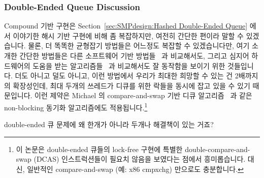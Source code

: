 \subsubsection{Double-Ended Queue Discussion}
\label{sec:SMPdesign:Double-Ended Queue Discussion}

Compound 기반 구현은 Section~\ref{sec:SMPdesign:Hashed Double-Ended Queue} 에서
이야기한 해시 기반 구현에 비해 좀 복잡하지만, 여전히 간단한 편이라 말할 수
있겠습니다.
물론, 더 똑똑한 균형잡기 방법들은 어느정도 복잡할 수 있겠습니다만, 여기 소개한
간단한 방법들은 다른 소프트웨어 기반
방법들~\cite{LukeDalessandro:2011:ASPLOS:HybridNOrecSTM:deque} 과 비교해서도,
그리고 심지어 하드웨어의 도움을 받는
알고리즘들~\cite{DavidDice:2010:SCA:HTM:deque} 과 비교해서도 잘 동작함을 보이기
위한 것들입니다.
더도 아니고 덜도 아니고, 이런 방법에서 우리가 최대한 희망할 수 있는 건
2배까지의 확장성인데, 최대 두개의 쓰레드가 디큐를 위한 락들을 동시에 잡고 있을
수 있기 때문입니다.
이런 제약은 Michael 의 compare-and-swap 기반 디큐
알고리즘~\cite{DBLP:conf/europar/Michael03} 과 같은 non-blocking 동기화
알고리즘에도 적용됩니다.\footnote{
	이 논문은 double-ended 큐들의 lock-free 구현에 특별한
	double-compare-and-swap (DCAS) 인스트럭션들이 필요치 않음을 보였다는
	점에서 흥미롭습니다.
	대신, 일반적인 compare-and-swap (예: x86 cmpxchg) 만으로도 충분합니다.}

\QuickQuiz{}
	double-ended 큐 문제에 왜 한개가 아니라 두개나 해결책이 있는 거죠?
	\iffalse

